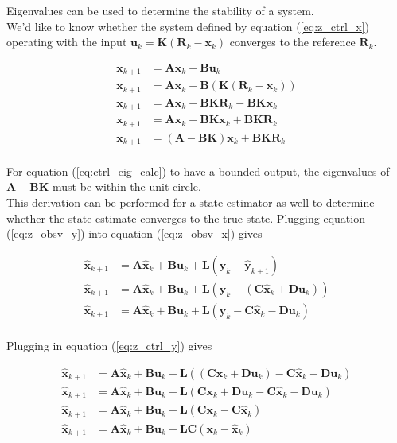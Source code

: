 \documentclass[10pt,conference,compsoc]{IEEEtran}
\newcommand{\mtx}[1] {\bm #1}
\begin{document}
\noindent Eigenvalues can be used to determine the stability of a \gls{system}.
\\

\noindent We'd like to know whether the \gls{system} defined by equation
(\ref{eq:z_ctrl_x}) operating with the input
$\mtx{u}_k = \mtx{K}(\mtx{R}_k - \mtx{x}_k)$ converges to the \gls{reference}
$\mtx{R}_k$.

\begin{align}
  \mtx{x}_{k+1} &= \mtx{A}\mtx{x}_k + \mtx{B}\mtx{u}_k \nonumber \\
  \mtx{x}_{k+1} &= \mtx{A}\mtx{x}_k + \mtx{B}(\mtx{K}(\mtx{R}_k - \mtx{x}_k))
    \nonumber \\
  \mtx{x}_{k+1} &= \mtx{A}\mtx{x}_k + \mtx{B}\mtx{K}\mtx{R}_k -
    \mtx{B}\mtx{K}\mtx{x}_k \nonumber \\
  \mtx{x}_{k+1} &= \mtx{A}\mtx{x}_k - \mtx{B}\mtx{K}\mtx{x}_k +
    \mtx{B}\mtx{K}\mtx{R}_k \nonumber \\
  \mtx{x}_{k+1} &= (\mtx{A} - \mtx{B}\mtx{K})\mtx{x}_k +
    \mtx{B}\mtx{K}\mtx{R}_k \label{eq:ctrl_eig_calc}
\end{align}
\\
\noindent For equation (\ref{eq:ctrl_eig_calc}) to have a bounded output, the
eigenvalues of $\mtx{A} - \mtx{B}\mtx{K}$ must be within the unit circle. \\

\noindent This derivation can be performed for a \gls{state} estimator as well
to determine whether the \gls{state} estimate converges to the true \gls{state}.
Plugging equation (\ref{eq:z_obsv_y}) into equation (\ref{eq:z_obsv_x}) gives

\begin{align*}
  \hat{\mtx{x}}_{k+1} &= \mtx{A}\hat{\mtx{x}}_k + \mtx{B}\mtx{u}_k +
    \mtx{L} (\mtx{y}_k - \hat{\mtx{y}}_{k+1}) \\
  \hat{\mtx{x}}_{k+1} &= \mtx{A}\hat{\mtx{x}}_k + \mtx{B}\mtx{u}_k +
    \mtx{L} (\mtx{y}_k - (\mtx{C}\hat{\mtx{x}}_k + \mtx{D}\mtx{u}_k)) \\
  \hat{\mtx{x}}_{k+1} &= \mtx{A}\hat{\mtx{x}}_k + \mtx{B}\mtx{u}_k +
    \mtx{L} (\mtx{y}_k - \mtx{C}\hat{\mtx{x}}_k - \mtx{D}\mtx{u}_k) \\
\end{align*}

\noindent Plugging in equation (\ref{eq:z_ctrl_y}) gives

\begin{align*}
  \hat{\mtx{x}}_{k+1} &= \mtx{A}\hat{\mtx{x}}_k + \mtx{B}\mtx{u}_k +
    \mtx{L}((\mtx{C}\mtx{x}_k + \mtx{D}\mtx{u}_k) - \mtx{C}\hat{\mtx{x}}_k -
    \mtx{D}\mtx{u}_k) \\
  \hat{\mtx{x}}_{k+1} &= \mtx{A}\hat{\mtx{x}}_k + \mtx{B}\mtx{u}_k +
    \mtx{L}(\mtx{C}\mtx{x}_k + \mtx{D}\mtx{u}_k - \mtx{C}\hat{\mtx{x}}_k -
    \mtx{D}\mtx{u}_k) \\
  \hat{\mtx{x}}_{k+1} &= \mtx{A}\hat{\mtx{x}}_k + \mtx{B}\mtx{u}_k +
    \mtx{L}(\mtx{C}\mtx{x}_k - \mtx{C}\hat{\mtx{x}}_k) \\
  \hat{\mtx{x}}_{k+1} &= \mtx{A}\hat{\mtx{x}}_k + \mtx{B}\mtx{u}_k +
    \mtx{L}\mtx{C}(\mtx{x}_k - \hat{\mtx{x}}_k) \\
\end{align*}
\end{document}
